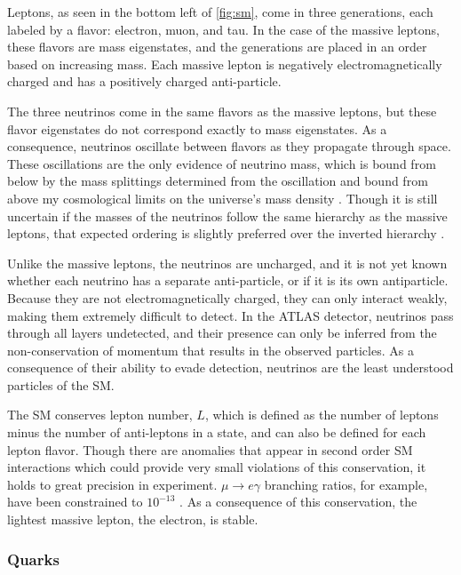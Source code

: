 Leptons, as seen in the bottom left of \autoref{fig:sm}, come in three generations, each labeled by a flavor: electron, muon, and tau. In the case of the massive leptons, these flavors are mass eigenstates, and the generations are placed in an order based on increasing mass. Each massive lepton is negatively electromagnetically charged and has a positively charged anti-particle. 

The three neutrinos come in the same flavors as the massive leptons, but these flavor eigenstates do not correspond exactly to mass eigenstates. As a consequence, neutrinos oscillate between flavors as they propagate through space. These oscillations are the only evidence of neutrino mass, which is bound from below by the mass splittings determined from the oscillation and bound from above my cosmological limits on the universe's mass density \cite{1979PhLB...87..144H}. Though it is still uncertain if the masses of the neutrinos follow the same hierarchy as the massive leptons, that expected ordering is slightly preferred over the inverted hierarchy \cite{Huang:2016}. 

Unlike the massive leptons, the neutrinos are uncharged, and it is not yet known whether each neutrino has a separate anti-particle, or if it is its own antiparticle. Because they are not electromagnetically charged, they can only interact weakly, making them extremely difficult to detect. In the ATLAS detector, neutrinos pass through all layers undetected, and their presence can only be inferred from the non-conservation of momentum that results in the observed particles. As a consequence of their ability to evade detection, neutrinos are the least understood particles of the \ac{SM}. 

The \ac{SM} conserves lepton number, $L$, which is defined as the number of leptons minus the number of anti-leptons in a state, and can also be defined for each lepton flavor. Though there are anomalies that appear in second order \ac{SM} interactions which could provide very small violations of this conservation, it holds to great precision in experiment. $\mu \rightarrow e\gamma$ branching ratios, for example, have been constrained to $10^{-13}$ \cite{1605.05081}. As a consequence of this conservation, the lightest massive lepton, the electron, is stable.

\subsubsection{Quarks}
\label{sec:quarks}


